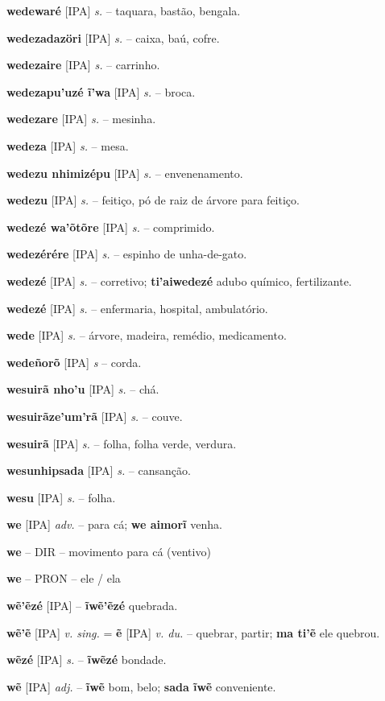\textbf{wedewaré} [IPA] \textit{s.} -- taquara, bastão, bengala.

\textbf{wedezadazöri} [IPA] \textit{s.} -- caixa, baú, cofre.

\textbf{wedezaire} [IPA] \textit{s.} -- carrinho.

\textbf{wedezapu'uzé ĩ'wa} [IPA] \textit{s.} -- broca.

\textbf{wedezare} [IPA] \textit{s.} -- mesinha.

\textbf{wedeza} [IPA] \textit{s.} -- mesa.

\textbf{wedezu nhimizépu} [IPA] \textit{s.} -- envenenamento.

\textbf{wedezu} [IPA] \textit{s.} -- feitiço, pó de raiz de árvore para feitiço.

\textbf{wedezé wa'õtõre} [IPA] \textit{s.} -- comprimido.

\textbf{wedezérére} [IPA] \textit{s.} -- espinho de unha-de-gato.

\textbf{wedezé} [IPA] \textit{s.} -- corretivo; \textbf{ti'aiwedezé} adubo químico, fertilizante.

\textbf{wedezé} [IPA] \textit{s.} -- enfermaria, hospital, ambulatório.

\textbf{wede} [IPA] \textit{s.} -- árvore, madeira, remédio, medicamento.

\textbf{wedeñorõ} [IPA] \textit{s} -- corda.

\textbf{wesuirã nho'u} [IPA] \textit{s.} -- chá.

\textbf{wesuirãze'um'rã} [IPA] \textit{s.} -- couve.

\textbf{wesuirã} [IPA] \textit{s.} -- folha, folha verde, verdura.

\textbf{wesunhipsada} [IPA] \textit{s.} -- cansanção.

\textbf{wesu} [IPA] \textit{s.} -- folha.

\textbf{we} [IPA] \textit{adv.} -- para cá; \textbf{we aimorĩ} venha.

\textbf{we} -- {DIR} -- {movimento para cá (ventivo)}

\textbf{we} -- {PRON} -- {ele / ela}

\textbf{wẽ'ẽzé} [IPA] \textit{} -- \textbf{ĩwẽ'ẽzé} quebrada.

\textbf{wẽ'ẽ} [IPA] \textit{v. sing.} = \textbf{ẽ} [IPA] \textit{v. du.} -- quebrar, partir; \textbf{ma ti'ẽ} ele quebrou.

\textbf{wẽzé} [IPA] \textit{s.} -- \textbf{ĩwẽzé} bondade.

\textbf{wẽ} [IPA] \textit{adj.} -- \textbf{ĩwẽ} bom, belo; \textbf{sada ĩwẽ} conveniente.


